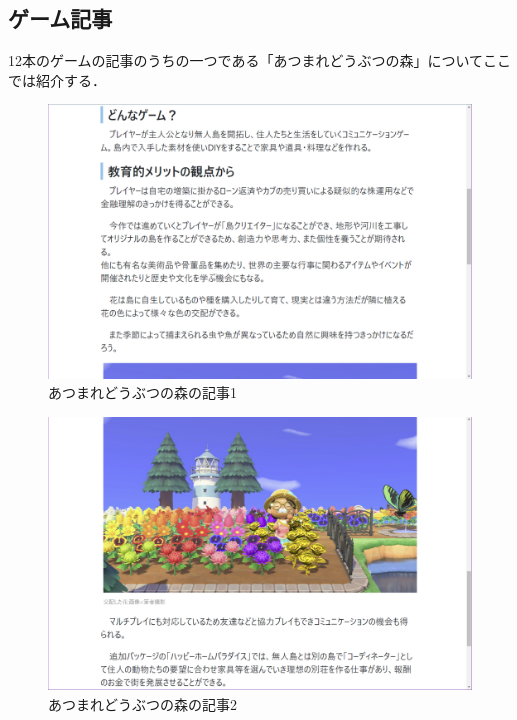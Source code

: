 \documentclass[12pt,a4j,titlepage]{ltjsarticle}
\begin{document}
\subsection{ゲーム記事}
12本のゲームの記事のうちの一つである「あつまれどうぶつの森」についてここでは紹介する．


\vspace{1zh}
\begin{figure}[H]
\begin{center}
 \includegraphics[keepaspectratio, scale=0.35]{あつ森1.pdf}
\end{center}
 \caption{あつまれどうぶつの森の記事1}
 \label{fig:あつ森1}
\end{figure}

\vspace{1zh}
\begin{figure}[H]
\begin{center}
 \includegraphics[keepaspectratio, scale=0.35]{あつ森2.pdf}
\end{center}
 \caption{あつまれどうぶつの森の記事2}
 \label{fig:あつ森2}
\end{figure}
\end{document}
